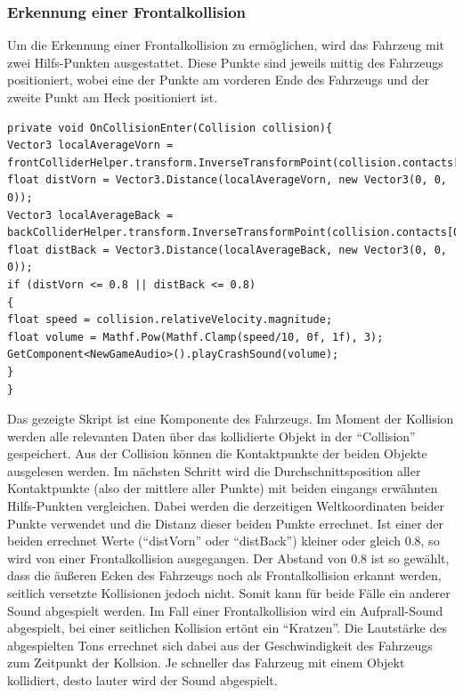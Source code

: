 	\subsubsection{Erkennung einer Frontalkollision}
	Um die Erkennung einer Frontalkollision zu ermöglichen, wird das Fahrzeug mit zwei Hilfs-Punkten ausgestattet. Diese Punkte sind jeweils mittig des Fahrzeugs positioniert, wobei eine der Punkte am vorderen Ende des Fahrzeugs und der zweite Punkt am Heck positioniert ist. 
	\begin{lstlisting}
private void OnCollisionEnter(Collision collision){
Vector3 localAverageVorn = frontColliderHelper.transform.InverseTransformPoint(collision.contacts[0].point);
float distVorn = Vector3.Distance(localAverageVorn, new Vector3(0, 0, 0));
Vector3 localAverageBack = backColliderHelper.transform.InverseTransformPoint(collision.contacts[0].point);
float distBack = Vector3.Distance(localAverageBack, new Vector3(0, 0, 0));
if (distVorn <= 0.8 || distBack <= 0.8)
{
float speed = collision.relativeVelocity.magnitude;
float volume = Mathf.Pow(Mathf.Clamp(speed/10, 0f, 1f), 3);
GetComponent<NewGameAudio>().playCrashSound(volume);
}
}
\end{lstlisting}
	Das gezeigte Skript ist eine Komponente des Fahrzeugs. Im Moment der Kollision werden alle relevanten Daten über das kollidierte Objekt in der \enquote{Collision} gespeichert. Aus der Collision können die Kontaktpunkte der beiden Objekte ausgelesen werden. Im nächsten Schritt wird die Durchschnittsposition aller Kontaktpunkte (also der mittlere aller Punkte) mit beiden eingangs erwähnten Hilfs-Punkten vergleichen. Dabei werden die derzeitigen Weltkoordinaten beider Punkte verwendet und die Distanz dieser beiden Punkte errechnet. Ist einer der beiden errechnet Werte (\enquote{distVorn} oder \enquote{distBack}) kleiner oder gleich 0.8, so wird von einer Frontalkollision ausgegangen. Der Abstand von 0.8 ist so gewählt, dass die äußeren Ecken des Fahrzeugs noch als Frontalkollision erkannt werden, seitlich versetzte Kollisionen jedoch nicht. Somit kann für beide Fälle ein anderer Sound abgespielt werden. Im Fall einer Frontalkollision wird ein Aufprall-Sound abgespielt, bei einer seitlichen Kollision ertönt ein \enquote{Kratzen}.
	Die Lautstärke des abgespielten Tons errechnet sich dabei aus der Geschwindigkeit des Fahrzeugs zum Zeitpunkt der Kollsion. Je schneller das Fahrzeug mit einem Objekt kollidiert, desto lauter wird der Sound abgespielt.

